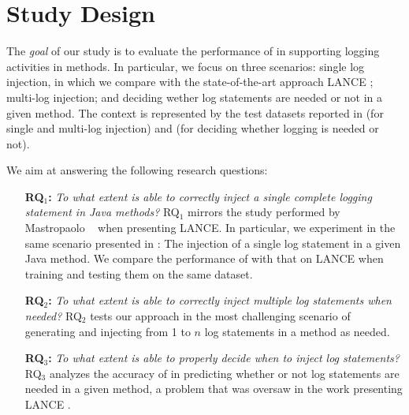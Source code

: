 \section{Study Design} \label{sec:design}

The \emph{goal} of our study is to evaluate the performance of \approach in supporting logging activities in \java methods. In particular, we focus on three scenarios: single log injection, in which we compare with the state-of-the-art approach LANCE \cite{mastropaolo2022using}; multi-log injection; and deciding wether log statements are needed or not in a given \java method. The context is represented by the test datasets reported in  (for single and multi-log injection) and  (for deciding whether logging is needed or not).

We aim at answering the following research questions:

\begin{itemize}

\item[\textbf{RQ$_1$:}]\textit{To what extent is \approach able to correctly inject a single complete logging statement in Java methods?} RQ$_1$ mirrors the study performed by Mastropaolo \etal~\cite{mastropaolo2022using} when presenting LANCE. In particular, we experiment \approach in the same scenario presented in \cite{mastropaolo2022using}: The injection of a single log statement in a given Java method. We compare the performance of \approach with that on LANCE when training and testing them on the same dataset. 

\item[\textbf{RQ$_2$:}]\textit{To what extent is \approach able to correctly inject multiple log statements when needed?} RQ$_2$ tests our approach in the most challenging scenario of generating and injecting from 1 to $n$ log statements in a \java method as needed.

\item[\textbf{RQ$_3$:}]\textit{To what extent is \approach able to properly decide when to inject log statements?} RQ$_3$ analyzes the accuracy of \approach in predicting whether or not log statements are needed in a given \java method, a problem that was oversaw in the work presenting LANCE \cite{mastropaolo2022using}.

\end{itemize}

